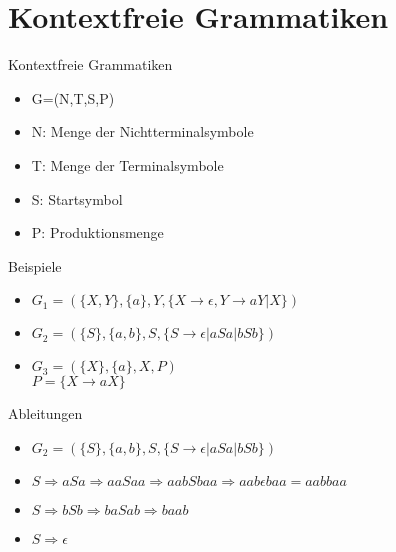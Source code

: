 \section{Kontextfreie Grammatiken}

\begin{frame}{Kontextfreie Grammatiken}
  \begin{itemize}
    \item G=(N,T,S,P)
    \item N: Menge der Nichtterminalsymbole
    \item T: Menge der Terminalsymbole
    \item S: Startsymbol
    \item P: Produktionsmenge
  \end{itemize}
\end{frame}

\begin{frame}{Beispiele}
  \begin{itemize}
    \item $G_1=(\{X,Y\},\{a\},Y,\{X\rightarrow \epsilon,Y\rightarrow aY|X\})$
    \item $G_2=(\{S\},\{a,b\},S,\{S\rightarrow \epsilon |aSa|bSb\})$
    \item $G_3=(\{X\},\{a\},X,P)$\\
      $P=\{X\rightarrow aX\}$
  \end{itemize}
\end{frame}

\begin{frame}{Ableitungen}
  \begin{itemize}
    \item $G_2=(\{S\},\{a,b\},S,\{S\rightarrow \epsilon |aSa|bSb\})$
    \item $S\Rightarrow aSa \Rightarrow aaSaa \Rightarrow aabSbaa \Rightarrow aab \epsilon baa =aabbaa$
    \item $S\Rightarrow bSb \Rightarrow baSab \Rightarrow baab$
    \item $S\Rightarrow \epsilon$
  \end{itemize}
\end{frame}

